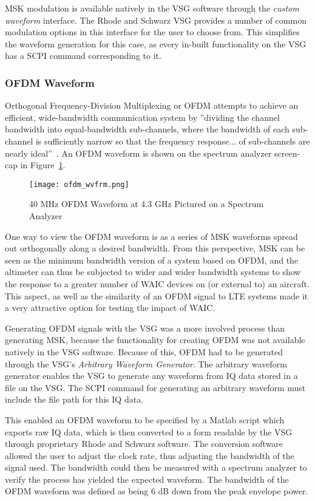 MSK modulation is available natively in the VSG software through the \textit{custom waveform} interface.  The Rhode and Schwarz VSG provides a number of common modulation options in this interface for the user to choose from. This simplifies the waveform generation for this case, as every in-built functionality on the VSG has a SCPI command corresponding to it. 


\subsubsection{OFDM Waveform}\label{subsub:OFDM}

Orthogonal Frequency-Division Multiplexing or OFDM attempts to achieve an efficient, wide-bandwidth communication system by ''dividing the channel bandwidth into equal-bandwidth sub-channels, where the bandwidth of each sub-channel is sufficiently narrow so that the frequency response... of sub-channels are nearly ideal''~\cite{proakis_communication_2002}. An OFDM waveform is shown on the spectrum analyzer screen-cap in Figure~\ref{fig:OFDM}.
\begin{figure}[ht]
\centering
\texttt{[image: ofdm\_wvfrm.png]}
\caption{40 MHz OFDM Waveform at 4.3 GHz Pictured on a Spectrum Analyzer}

\label{fig:OFDM}

\end{figure}
One way to view the OFDM waveform is as a series of MSK waveforms spread out orthogonally along a desired bandwidth. From this perspective, MSK can be seen as the minimum bandwidth version of a system based on OFDM, and the altimeter can thus be subjected to wider and wider bandwidth systems to show the response to a greater number of WAIC devices on (or external to) an aircraft. This aspect, as well as the similarity of an OFDM signal to LTE systems made it a very attractive option for testing the impact of WAIC. 

Generating OFDM signals with the VSG was a more involved process than generating MSK, because the functionality for creating OFDM was not available natively in the VSG software. Because of this, OFDM had to be generated through the VSG's \textit{Arbitrary Waveform Generator}. The arbitrary waveform generator enables the VSG to generate any waveform from IQ data stored in a file on the VSG. The SCPI command for generating an arbitrary waveform must include the file path for this IQ data.  

This enabled an OFDM waveform to be specified by a Matlab script which exports raw IQ data, which is then converted to a form readable by the VSG through proprietary Rhode and Schwarz software. The conversion software allowed the user to adjust the clock rate, thus adjusting the bandwidth of the signal used. The bandwidth could then be measured with a spectrum analyzer to verify the process has yielded the expected waveform. The bandwidth of the OFDM waveform was defined as being 6 dB down from the peak envelope power. 


